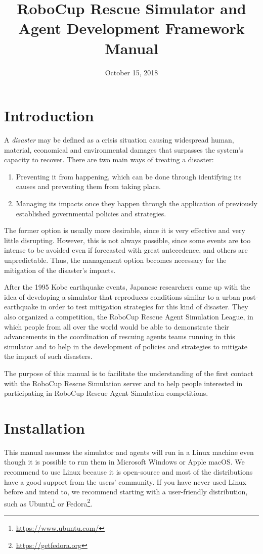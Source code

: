 \documentclass{article}
\begin{document}
\title{RoboCup Rescue Simulator and Agent Development Framework Manual}
\author{}
\date{October 15, 2018}
\maketitle
\tableofcontents
\section{Introduction}
A \emph{disaster} may be defined as a crisis situation causing widespread human, material, economical and environmental damages that surpasses the system's capacity to recover. There are two main ways of treating a disaster:

\begin{enumerate}
  \item Preventing it from happening, which can be done through identifying its causes and preventing them from taking place.
  \item Managing its impacts once they happen through the application of previously established governmental policies and strategies.
\end{enumerate}

The former option is usually more desirable, since it is very effective and very little disrupting. However, this is not always possible, since some events are too intense to be avoided even if forecasted with great antecedence, and others are unpredictable. Thus, the management option becomes necessary for the mitigation of the disaster's impacts.

After the 1995 Kobe earthquake events, Japanese researchers came up with the idea of developing a simulator that reproduces conditions similar to a urban post-earthquake in order to test mitigation strategies for this kind of disaster. They also organized a competition, the RoboCup Rescue Agent Simulation League, in which people from all over the world would be able to demonstrate their advancements in the coordination of rescuing agents teams running in this simulator and to help in the development of policies and strategies to mitigate the impact of such disasters.

The purpose of this manual is to facilitate the understanding of the first contact with the RoboCup Rescue Simulation server and to help people interested in participating in RoboCup Rescue Agent Simulation competitions.
\section{Installation}
This manual assumes the simulator and agents will run in a Linux machine even though it is possible to run them in Microsoft Windows or Apple macOS. We recommend to use Linux because it is open-source and most of the distributions have a good support from the users' community. If you have never used Linux before and intend to, we recommend starting with a user-friendly distribution, such as Ubuntu\footnote{\url{https://www.ubuntu.com/}} or Fedora\footnote{\url{https://getfedora.org}}.
\end{document}
